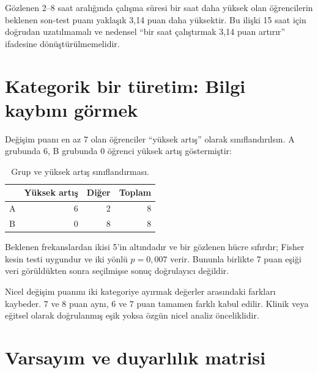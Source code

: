 Gözlenen 2--8 saat aralığında çalışma süresi bir saat daha yüksek olan
öğrencilerin beklenen son-test puanı yaklaşık 3,14 puan daha yüksektir. Bu
ilişki 15 saat için doğrudan uzatılmamalı ve nedensel ``bir saat çalıştırmak
3,14 puan artırır'' ifadesine dönüştürülmemelidir.

\section{Kategorik bir türetim: Bilgi kaybını görmek}

Değişim puanı en az 7 olan öğrenciler ``yüksek artış'' olarak sınıflandırılsın.
A grubunda 6, B grubunda 0 öğrenci yüksek artış göstermiştir:

\begin{table}[htbp]
\centering
\caption{Grup ve yüksek artış sınıflandırması.}
\begin{tabular}{@{}lrrr@{}}
\toprule
 & Yüksek artış & Diğer & Toplam \\
\midrule
A & 6 & 2 & 8 \\
B & 0 & 8 & 8 \\
\bottomrule
\end{tabular}
\end{table}

Beklenen frekanslardan ikisi 5'in altındadır ve bir gözlenen hücre sıfırdır;
Fisher kesin testi uygundur ve iki yönlü $p=0{,}007$ verir. Bununla birlikte 7
puan eşiği veri görüldükten sonra seçilmişse sonuç doğrulayıcı değildir.

Nicel değişim puanını iki kategoriye ayırmak değerler arasındaki farkları
kaybeder. 7 ve 8 puan aynı, 6 ve 7 puan tamamen farklı kabul edilir. Klinik
veya eğitsel olarak doğrulanmış eşik yoksa özgün nicel analiz önceliklidir.

\section{Varsayım ve duyarlılık matrisi}

